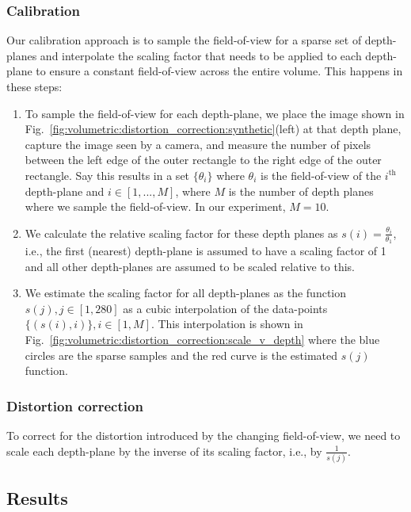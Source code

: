 \subsubsection{Calibration}
\label{sec:volumetric:distortion_correction:calibration}
Our calibration approach is to sample the field-of-view for a sparse set of depth-planes and interpolate the scaling factor that needs to be applied to each depth-plane to ensure a constant field-of-view across the entire volume. This happens in these steps:


\begin{enumerate}
    \item To sample the field-of-view for each depth-plane, we place the image shown in Fig.~\ref{fig:volumetric:distortion_correction:synthetic}(left) at that depth plane, capture the image seen by a camera, and measure the number of pixels between the left edge of the outer rectangle to the right edge of the outer rectangle. Say this results in a set $\{\theta_i\}$ where $\theta_i$ is the field-of-view of the $i^{\text{th}}$ depth-plane and $i \in [1,...,M]$, where $M$ is the number of depth planes where we sample the field-of-view. In our experiment, $M = 10$.
    \item We calculate the relative scaling factor for these depth planes as $s(i) = \frac{\theta_i}{\theta_1}$, i.e., the first (nearest) depth-plane is assumed to have a scaling factor of 1 and all other depth-planes are assumed to be scaled relative to this.
    \item We estimate the scaling factor for all depth-planes as the function $s(j), j \in [1,280]$ as a cubic interpolation of the data-points $\{(s(i), i)\}, i\in [1,M]$. This interpolation is shown in Fig.~\ref{fig:volumetric:distortion_correction:scale_v_depth} where the blue circles are the sparse samples and the red curve is the estimated $s(j)$ function.
\end{enumerate}

\subsubsection{Distortion correction}
To correct for the distortion introduced by the changing field-of-view, we need to scale each depth-plane by the inverse of its scaling factor, i.e., by $\frac{1}{s(j)}$.

\subsection{Results}


